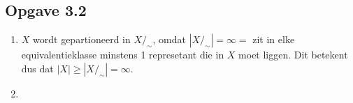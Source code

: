 \documentclass{article}
\newcommand{\Z}{\mathbb{Z}}
\newcommand{\q}{/_\sim}
\begin{document}
\subsection*{Opgave 3.2}
\begin{enumerate}[label=\alph*)]
    \item $X$ wordt gepartioneerd in $X/_\sim$, omdat $|X/_\sim| = \infty =$ zit in elke equivalentieklasse minstens 1 represetant die in $X$ moet liggen. Dit betekent dus dat $|X| \geq |X/_\sim| = \infty$.
    \item
\end{enumerate}
\end{document}
